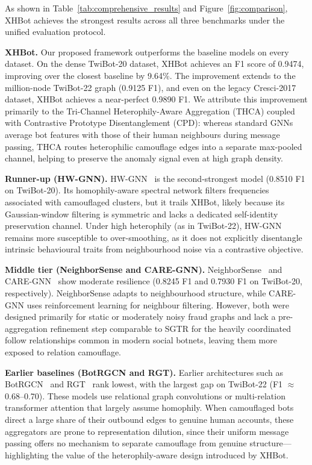 As shown in Table~\ref{tab:comprehensive_results} and Figure~\ref{fig:comparison}, XHBot achieves the strongest results across all three benchmarks under the unified evaluation protocol.

\textbf{XHBot.} Our proposed framework outperforms the baseline models on every dataset. On the dense TwiBot-20 dataset, XHBot achieves an F1 score of 0.9474, improving over the closest baseline by 9.64\%. The improvement extends to the million-node TwiBot-22 graph (0.9125 F1), and even on the legacy Cresci-2017 dataset, XHBot achieves a near-perfect 0.9890 F1. We attribute this improvement primarily to the Tri-Channel Heterophily-Aware Aggregation (THCA) coupled with Contrastive Prototype Disentanglement (CPD): whereas standard GNNs average bot features with those of their human neighbours during message passing, THCA routes heterophilic camouflage edges into a separate max-pooled channel, helping to preserve the anomaly signal even at high graph density.

\textbf{Runner-up (HW-GNN).} HW-GNN~\cite{liu2025hwgnn} is the second-strongest model (0.8510 F1 on TwiBot-20). Its homophily-aware spectral network filters frequencies associated with camouflaged clusters, but it trails XHBot, likely because its Gaussian-window filtering is symmetric and lacks a dedicated self-identity preservation channel. Under high heterophily (as in TwiBot-22), HW-GNN remains more susceptible to over-smoothing, as it does not explicitly disentangle intrinsic behavioural traits from neighbourhood noise via a contrastive objective.

\textbf{Middle tier (NeighborSense and CARE-GNN).} NeighborSense~\cite{li2026neighborsense} and CARE-GNN~\cite{dou2020caregnn} show moderate resilience (0.8245 F1 and 0.7930 F1 on TwiBot-20, respectively). NeighborSense adapts to neighbourhood structure, while CARE-GNN uses reinforcement learning for neighbour filtering. However, both were designed primarily for static or moderately noisy fraud graphs and lack a pre-aggregation refinement step comparable to SGTR for the heavily coordinated follow relationships common in modern social botnets, leaving them more exposed to relation camouflage.

\textbf{Earlier baselines (BotRGCN and RGT).} Earlier architectures such as BotRGCN~\cite{feng2021botrgcn} and RGT~\cite{feng2022rgt} rank lowest, with the largest gap on TwiBot-22 (F1 $\approx$ 0.68--0.70). These models use relational graph convolutions or multi-relation transformer attention that largely assume homophily. When camouflaged bots direct a large share of their outbound edges to genuine human accounts, these aggregators are prone to representation dilution, since their uniform message passing offers no mechanism to separate camouflage from genuine structure---highlighting the value of the heterophily-aware design introduced by XHBot.

